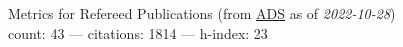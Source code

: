 Metrics for Refereed Publications (from \href{\adsurl}{ADS} as of \textit{2022-10-28}) \\count: 43 --- citations: 1814 --- h-index: 23